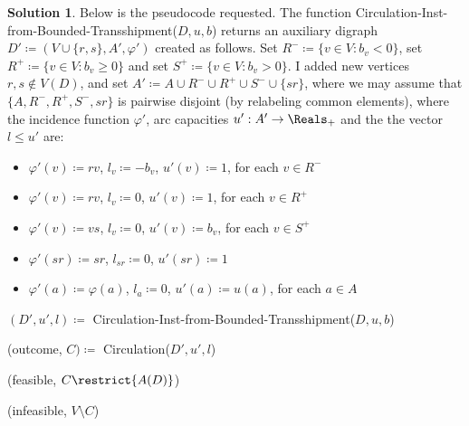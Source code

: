 \documentclass[11pt,leqno,final]{amsart}
\theoremstyle{definition}
\newtheorem{solution}{Solution}
\begin{document}
\begin{solution}
   Below is the pseudocode requested. The function Circulation-Inst-from-Bounded-Transshipment($D, u, b$) returns an auxiliary digraph $D' \coloneqq (V \cup \{r, s\}, A', \varphi')$ created as follows. Set $R^{-} \coloneqq \{v \in V : b_v < 0\}$, set $R^{+} \coloneqq \{v \in V : b_v \geq 0\}$  and set $S^{+} \coloneqq \{v \in V : b_v > 0\}$. I added new vertices $r, s \notin V(D)$, and set $A' \coloneqq A\cup R^{-} \cup R^{+} \cup S^{-} \cup \{sr\}$, where we may assume that $\{A, R^{-}, R^{+}, S^{-}, {sr}\}$ is pairwise disjoint (by relabeling common elements), where the incidence function $\varphi'$, arc capacities $u': A' \to \Reals_{+}$ and the the vector $l \leq u'$ are:
  \begin{itemize}
    \item $\varphi'(v) \coloneqq rv$, $l_v \coloneqq -b_v$, $u'(v) \coloneqq \mathcal{1}$, for each $v \in R^{-}$
    \item $\varphi'(v) \coloneqq rv$, $l_v \coloneqq 0$, $u'(v) \coloneqq \mathcal{1}$, for each $v \in R^{+}$
    \item $\varphi'(v) \coloneqq vs$, $l_v \coloneqq 0$, $u'(v) \coloneqq b_v$, for each $v \in S^{+}$
    \item $\varphi'(sr) \coloneqq sr$, $l_{sr} \coloneqq 0$, $u'(sr) \coloneqq \mathcal{1}$
    \item $\varphi'(a) \coloneqq \varphi(a)$, $l_a \coloneqq 0$, $u'(a) \coloneqq u(a)$, for each $a \in A$
  \end{itemize}

  \begin{algorithm}
    \caption{Bounded-Transshipment($D$, $u$, $b$)}\label{btrans}
    \begin{algorithmic}[1]

      \State $(D', u', l) \coloneqq$ Circulation-Inst-from-Bounded-Transshipment($D, u, b$)
      
      \State (outcome, $C) \coloneqq$ Circulation($D', u', l$)

        \State \Return (feasible, $C \restrict{A(D)}$)

        \State \Return (infeasible, $V \setminus C$)  
          
      \EndIf
        

\end{algorithmic}
\end{algorithm}
\end{solution}
\end{document}
